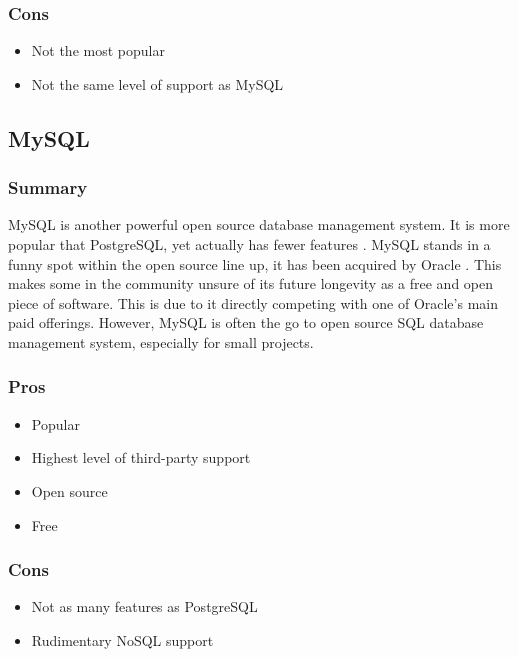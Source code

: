 \documentclass[draftclsnofoot,onecolumn,journal,letterpaper,compsoc,10pt]{IEEEtran}
\begin{document}
        \subsubsection{Cons}
        \begin{itemize}
            \item Not the most popular
            \item Not the same level of support as MySQL
        \end{itemize}
    
    \subsection{MySQL}
    
        \subsubsection{Summary}
        
        MySQL is another powerful open source database management system.  It is more popular that PostgreSQL, yet actually has fewer features \cite{db_comparison}.  MySQL stands in a funny spot within the open source line up, it has been acquired by Oracle \cite{mysql}.  This makes some in the community unsure of its future longevity as a free and open piece of software.  This is due to it directly competing with one of Oracle's main paid offerings.  However, MySQL is often the go to open source SQL database management system, especially for small projects.
        
        \subsubsection{Pros}
        \begin{itemize}
            \item Popular
            \item Highest level of third-party support
            \item Open source
            \item Free
        \end{itemize}
        
        \subsubsection{Cons}
        \begin{itemize}
            \item Not as many features as PostgreSQL
            \item Rudimentary NoSQL support
        \end{itemize}
        
\end{document}
